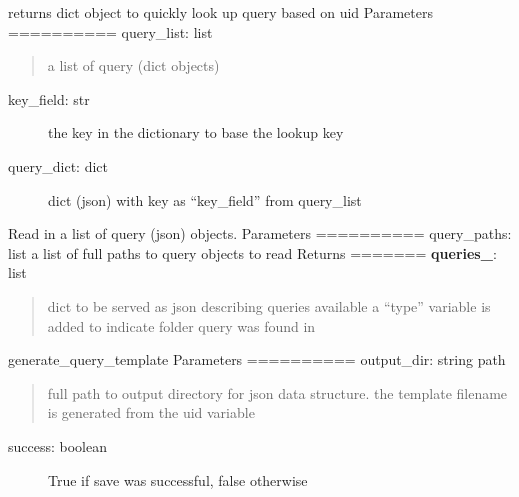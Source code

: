\documentclass[letterpaper,10pt,english]{sphinxmanual}
\begin{document}
\begin{fulllineitems}
\label{nidm:nidm.query.make_lookup}
returns dict object to quickly look up query based on uid
Parameters
==========
query\_list: list
\begin{quote}

a list of query (dict objects)
\end{quote}
\begin{description}
\item[{key\_field: str}] \leavevmode
the key in the dictionary to base the lookup key

\end{description}
\begin{description}
\item[{query\_dict: dict}] \leavevmode
dict (json) with key as ``key\_field'' from query\_list

\end{description}

\end{fulllineitems}


\begin{fulllineitems}
\label{nidm:nidm.query.read_queries}
Read in a list of query (json) objects.
Parameters
==========
query\_paths: list
a list of full paths to query objects to read
Returns
=======
{\color{red}\bfseries{}queries\_}: list
\begin{quote}

dict to be served as json describing queries available
a ``type'' variable is added to indicate folder query was found in
\end{quote}

\end{fulllineitems}


\begin{fulllineitems}
\label{nidm:nidm.query.save_query_template}
generate\_query\_template
Parameters
==========
output\_dir: string path
\begin{quote}

full path to output directory for json data structure.
the template filename is generated from the uid variable
\end{quote}
\begin{description}
\item[{success: boolean}] \leavevmode
True if save was successful, false otherwise

\end{description}

\end{fulllineitems}
\end{document}
